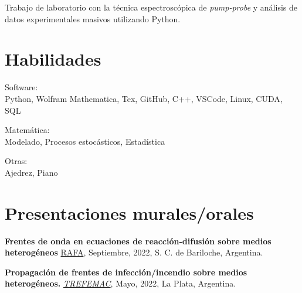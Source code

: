 \documentclass[a4paper,10pt]{article}
\begin{document}
\begin{adjustbox}{valign=t}
\begin{minipage}{0.5\textwidth}
\begin{description}
Trabajo de laboratorio con la técnica espectroscópica de \textit{pump-probe} y análisis de datos experimentales masivos utilizando Python.\;

\end{description}

\vspace*{-.9cm}
\section*{Habilidades}
\begin{description}
    \item \textcolor{ColorOne}{Software:} \\ Python, Wolfram Mathematica, Tex, GitHub, C++, VSCode, Linux, CUDA, SQL \vspace*{-.3cm}
    \item \textcolor{ColorOne}{Matemática:} \\ Modelado, Procesos estocásticos, Estadística \vspace*{-.3cm}
    \item \textcolor{ColorOne}{Otras:} \\ Ajedrez, Piano
\end{description}

\vspace*{-.9cm}
\section*{Presentaciones murales/orales}
\begin{description}
	\raggedright
	\item [-] \textbf{Frentes de onda en ecuaciones de reacción-difusión sobre medios heterogéneos} \href{https://rafa2022.fisica.org.ar/}{RAFA}, Septiembre, 2022, S. C. de Bariloche, Argentina.
	
	\item [-] \textbf{Propagación de frentes de infección/incendio sobre medios heterogéneos.} 
    {\href{https://sites.google.com/view/trefemac2022}{\it TREFEMAC}}, Mayo, 2022, La Plata, Argentina.

\end{description}

\vspace*{-.9cm}

\end{minipage}
\end{adjustbox}
\end{document}
